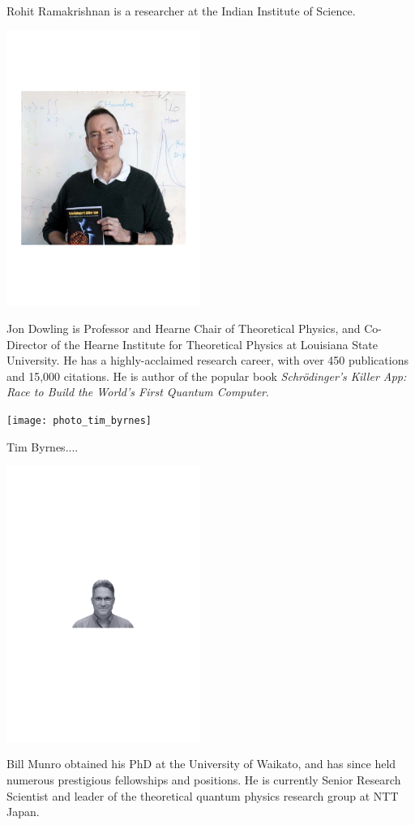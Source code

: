 Rohit Ramakrishnan is a researcher at the Indian Institute of Science.


%
%

\begin{center}
\includegraphics[width=0.475\textwidth]{photo_jon_dowling}
\end{center}

Jon Dowling is Professor and Hearne Chair of Theoretical Physics, and Co-Director of the Hearne Institute for Theoretical Physics at Louisiana State University. He has a highly-acclaimed research career, with over 450 publications and 15,000 citations. He is author of the popular book \textit{Schr\"odinger's Killer App: Race to Build the World's First Quantum Computer}.


%
%

\begin{center}
\texttt{[image: photo\_tim\_byrnes]}
\end{center}

Tim Byrnes....


%
%

\begin{center}
\includegraphics[width=0.475\textwidth]{photo_bill_munro}
\end{center}

Bill Munro obtained his PhD at the University of Waikato, and has since held numerous prestigious fellowships and positions. He is currently Senior Research Scientist and leader of the theoretical quantum physics research group at NTT Japan.

